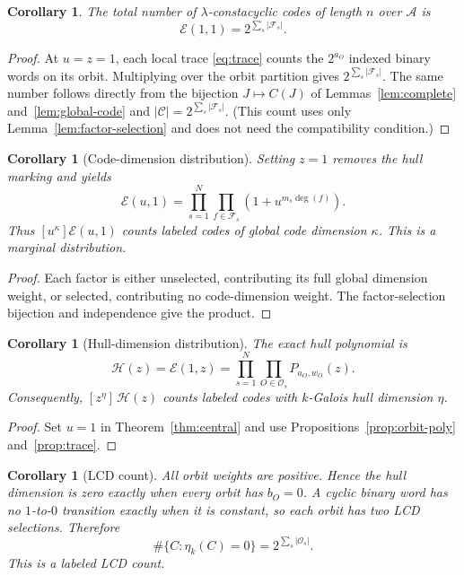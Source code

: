 \documentclass[10pt,a4paper]{article}
\newcommand{\A}{\mathcal A}
\newcommand{\Fs}{\mathcal F_s}
\newcommand{\Os}{\mathcal O_s}
\newcommand{\Epoly}{\mathscr E}
\numberwithin{equation}{section}
\theoremstyle{plain}
\newtheorem{corollary}[theorem]{Corollary}
\theoremstyle{definition}
\theoremstyle{remark}
\begin{document}
\begin{corollary}\label{cor:total}
The total number of $\lambda$-constacyclic codes of length $n$ over $\A$ is
\[
\Epoly(1,1)=2^{\sum_s|\Fs|}.
\]
\end{corollary}

\begin{proof}
At $u=z=1$, each local trace \eqref{eq:trace} counts the $2^{a_O}$ indexed binary
words on its orbit. Multiplying over the orbit partition gives
$2^{\sum_s|\Fs|}$. The same number follows directly from the bijection
$J\mapsto C(J)$ of Lemmas~\ref{lem:complete} and~\ref{lem:global-code} and
$|\mathscr C|=2^{\sum_s|\Fs|}$. (This count uses only
Lemma~\ref{lem:factor-selection} and does not need the compatibility condition.)
\end{proof}

\begin{corollary}[Code-dimension distribution]\label{cor:code-dist}
Setting $z=1$ removes the hull marking and yields
\begin{equation}\label{eq:dimdist}
\Epoly(u,1)=\prod_{s=1}^{N}\prod_{f\in\Fs}
\left(1+u^{m_s\deg(f)}\right).
\end{equation}
Thus $[u^{\kappa}]\Epoly(u,1)$ counts labeled codes of global code dimension
$\kappa$. This is a marginal distribution.
\end{corollary}

\begin{proof}
Each factor is either unselected, contributing its full global dimension weight,
or selected, contributing no code-dimension weight. The factor-selection bijection
and independence give the product.
\end{proof}

\begin{corollary}[Hull-dimension distribution]\label{cor:hull-dist}
The exact hull polynomial is
\begin{equation}\label{eq:hull-dist}
\mathcal H(z)=\Epoly(1,z)
 =\prod_{s=1}^{N}\prod_{O\in\Os}P_{a_O,w_O}(z).
\end{equation}
Consequently, $[z^{\eta}]\,\mathcal H(z)$ counts labeled codes with $k$-Galois
hull dimension $\eta$.
\end{corollary}

\begin{proof}
Set $u=1$ in Theorem~\ref{thm:central} and use
Propositions~\ref{prop:orbit-poly} and~\ref{prop:trace}.
\end{proof}

\begin{corollary}[LCD count]\label{cor:lcd}
All orbit weights are positive. Hence the hull dimension is zero exactly when
every orbit has $b_O=0$. A cyclic binary word has no $1$-to-$0$ transition exactly
when it is constant, so each orbit has two LCD selections. Therefore
\begin{equation}\label{eq:lcd}
\#\{C:\eta_k(C)=0\}=2^{\sum_s|\Os|}.
\end{equation}
This is a labeled LCD count.
\end{corollary}
\end{document}
